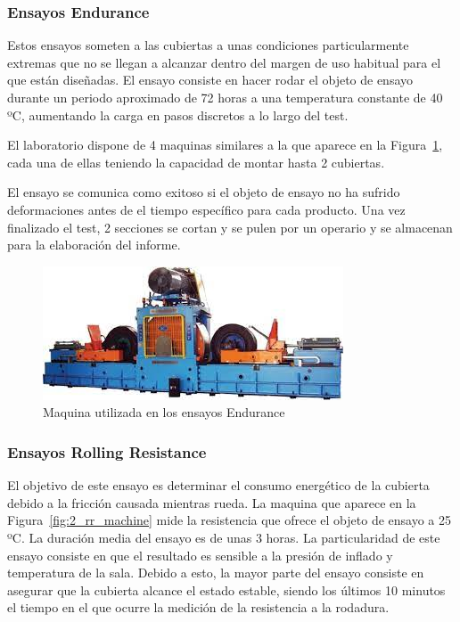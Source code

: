 \subsubsection{Ensayos Endurance}
Estos ensayos someten a las cubiertas a unas condiciones particularmente extremas
que no se llegan a alcanzar dentro del margen de uso habitual
para el que están diseñadas.
El ensayo consiste en hacer rodar el objeto de ensayo
durante un periodo aproximado de 72 horas a una temperatura constante de 40 ºC,
aumentando la carga en pasos discretos a lo largo del test.

El laboratorio dispone de 4 maquinas
similares a la que aparece en la Figura~\ref{fig:2_endurance_machine},
cada una de ellas teniendo la capacidad de montar hasta 2 cubiertas.

El ensayo se comunica como exitoso
si el objeto de ensayo no ha sufrido deformaciones
antes de el tiempo específico para cada producto.
Una vez finalizado el test, 2 secciones se cortan y se pulen 
por un operario y se almacenan para la elaboración del informe. 

\begin{figure}
	\begin{center}
		\includegraphics[width=\textwidth]{fig/2_endurance_machine}
	\end{center}
	\caption{Maquina utilizada en los ensayos Endurance}
	\label{fig:2_endurance_machine}
\end{figure}

\subsubsection{Ensayos Rolling Resistance}
El objetivo de este ensayo es determinar el consumo energético
de la cubierta debido a la fricción causada mientras rueda.
La maquina que aparece en la Figura~\ref{fig:2_rr_machine} mide la resistencia que ofrece
el objeto de ensayo a 25 ºC.
La duración media del ensayo es de unas 3 horas.
La particularidad de este ensayo consiste en que
el resultado es sensible a la presión de inflado y temperatura de la sala.
Debido a esto, la mayor parte del ensayo
consiste en asegurar que la cubierta alcance el estado estable,
siendo los últimos 10 minutos el tiempo en el que
ocurre la medición de la resistencia a la rodadura.

